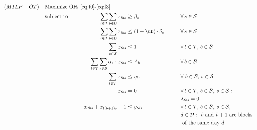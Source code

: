 \documentclass[review,3p,authoryear]{elsarticle}
\begin{document}
{\footnotesize
\linespread{1}\selectfont
\begin{alignat}{4}
    (\modelname) \quad & \omit\rlap{Maximize OFs~\eqref{eq:f0}-\eqref{eq:f3}}\nonumber\\
    & \mbox{subject to} && \quad & \sum_{\roomidx \in \roomset} \sum_{\blockidx \in \blockset} \blockvar  & \geq \mindeficit_{\specialtyidx}                    &\qquad & \forall\, \specialtyidx \in \specialtyset  \label{eq:m2-2}\\
    &                  && \quad & \sum_{\roomidx \in \roomset} \sum_{\blockidx \in \blockset} \blockvar  & \leq (1 + \ub) \cdot \demand_{\specialtyidx}   &\qquad & \forall\, \specialtyidx \in \specialtyset \label{eq:m2-3}\\
    &                  && \quad & \sum_{\specialtyidx \in \specialtyset} \blockvar                       & \leq 1     &\qquad & \forall\, \roomidx \in \roomset,\, \blockidx \in \blockset \label{eq:m2-4}\\
    &                  && \quad & \sum_{\roomidx \in \roomset} \sum_{\specialtyidx \in \specialtyset} \needanest_{\specialtyidx} \cdot \blockvar   & \leq \numbersanests_{\blockidx}                    &\qquad & \forall\, \blockidx \in \blockset \label{eq:m2-5}\\
    &                  && \quad & \sum_{\roomidx \in \roomset} \blockvar   & \leq \specteams_{\blockidx\specialtyidx}   &\qquad & \forall\, \,\blockidx \in \blockset,\,\specialtyidx \in \specialtyset \label{eq:m2-6}\\
    &                  && \quad & \blockvar   & = 0    &\qquad & \forall\, \roomidx \in \roomset,\,\blockidx \in \blockset,\,\specialtyidx \in \specialtyset : \nonumber\\
    &                  &&       &                                                          &                 &\qquad &\allowedrooms_{\roomidx\blockidx\specialtyidx} = 0 \label{eq:m2-7}\\
    &                  && \quad & \blockvar + x_{\roomidx(\blockidx+1)\specialtyidx} - 1   & \leq \precvar   &\qquad & \forall\, \roomidx \in \roomset,\, \blockidx \in \blockset,\,\specialtyidx \in \specialtyset, \nonumber\\
    &                  &&       &                                                          &                 &\qquad & \planninghorizonidx \in \planninghorizonset :\,\text{ $\blockidx$ and $\blockidx+1$ are blocks} \nonumber\\
    &                  &&       &                                                          &                 &\qquad & \text{ of the same day $\planninghorizonidx$}\label{eq:m2-8}\\

\end{alignat}}
\end{document}
